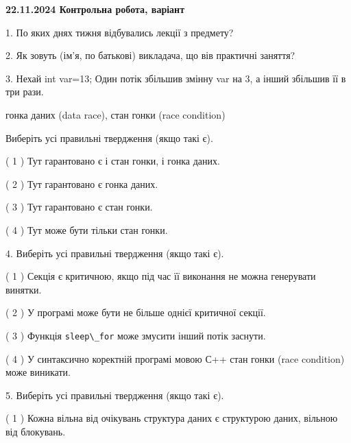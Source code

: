 \documentclass[12pt, ukrainian]{article}
\def\code#1{\Verb!#1!}
\begin{document}
\vspace{4mm}
\newpage
\begin {large}

\textbf{22.11.2024 Контрольна робота, варіант  }\par


{
1. По яких днях тижня відбувались лекції з предмету?



\vspace{5mm}
2. Як зовуть (ім'я, по батькові) викладача, що вів практичні заняття?



\vspace{5mm}
3. Нехай int var=13; Один потік збільшив змінну var на 3, а інший збільшив її в три рази.

гонка даних (data race), стан гонки (race condition)

Виберіть усі правильні твердження (якщо такі є).\par
\vspace{2mm}
( 1 ) Тут гарантовано є і стан гонки, і гонка даних.%

( 2 ) Тут гарантовано є гонка даних.%

( 3 ) Тут гарантовано є стан гонки.%

( 4 ) Тут може бути тільки стан гонки.%


\vspace{5mm}
4. Виберіть усі правильні твердження (якщо такі є).\par
\vspace{2mm}

( 1 ) Секція є критичною, якщо під час її виконання не можна генерувати винятки.%

( 2 ) У програмі може бути не більше однієї критичної секції.%

( 3 ) Функція \code{sleep\_for} може змусити інший потік заснути.%

( 4 ) У синтаксично коректній програмі мовою С++ стан гонки (race condition) може виникати.%


\vspace{5mm}
5. Виберіть усі правильні твердження (якщо такі є).\par
\vspace{2mm}

( 1 ) Кожна вільна від очікувань структура даних є структурою даних, вільною від блокувань.%

}
\end{large}
\end{document}
